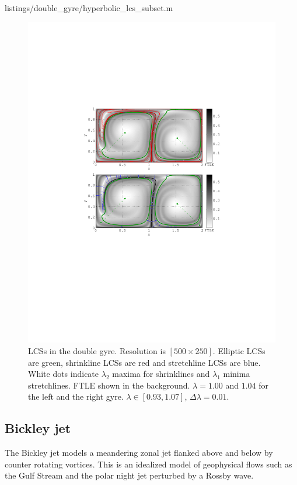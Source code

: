 \documentclass[5p]{elsarticle}
\begin{document}

        {listings/double_gyre/hyperbolic_lcs_subset.m}

\begin{figure}
\centering
\includegraphics[width=.475\textwidth]{graphics/double_gyre/lambda_hyperbolic_lcs}
\caption{
LCSs in the double gyre.
Resolution is $[500\times250]$.
Elliptic LCSs are green, shrinkline LCSs are red and stretchline LCSs are blue.
White dots indicate $\lambda_2$ maxima for shrinklines and $\lambda_1$ minima stretchlines.
FTLE shown in the background.
$\lambda = 1.00$ and $1.04$ for the left and the right gyre.
$\lambda \in [0.93,1.07]$, $\Delta\lambda = 0.01$.
}
\label{f:double gyre lambda hyperbolic LCS}
\end{figure}

\subsection{Bickley jet}

The Bickley jet models a meandering zonal jet flanked above and below by
counter rotating vortices. This is an idealized model of geophysical flows such as the Gulf Stream and the polar night jet perturbed by a Rossby wave\citep{castilloNegrete93:_chaot_rossb,beron-vera10:_invar_lagran}.
\end{document}
